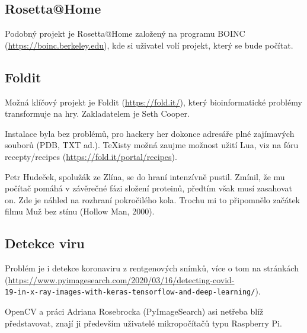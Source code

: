 \noindent
\hfil
{}


\subsection*{Rosetta@Home}

Podobný projekt je Rosetta@Home založený na programu BOINC (\url{https://boinc.berkeley.edu}), kde si uživatel volí projekt, který se bude počítat.



\subsection*{Foldit}

Možná klíčový projekt je Foldit (\url{https://fold.it/}), který bioinformatické problémy transformuje na hry. Zakladatelem je Seth Cooper.

Instalace byla bez problémů, pro hackery her dokonce adresáře plné zajímavých souborů (PDB, TXT ad.). \TeX isty možná zaujme možnost užití Lua, viz na fóru recepty/recipes (\url{https://fold.it/portal/recipes}).

Petr Hudeček, spolužák ze Zlína, se do hraní intenzívně pustil. Zmínil, že mu počítač pomáhá v závěrečné fázi složení proteinů, předtím však musí zasahovat on. Zde je náhled na rozhraní pokročilého kola. Trochu mi to připomnělo začátek filmu Muž bez stínu (Hollow Man, 2000).%
\smallskip

\noindent
{}

\enlargethispage{\baselineskip}



\subsection*{Detekce viru}

Problém je i detekce koronaviru z rentgenových snímků, více o tom na stránkách (\url{https://www.pyimagesearch.com/2020/03/16/detecting-covid-}\\ \texttt{19-in-x-ray-images-with-keras-tensorflow-and-deep-learning/}). 

OpenCV a práci Adriana Rosebrocka (PyImageSearch) asi netřeba blíž představovat, znají ji především uživatelé mikropočítačů typu Raspberry Pi.


